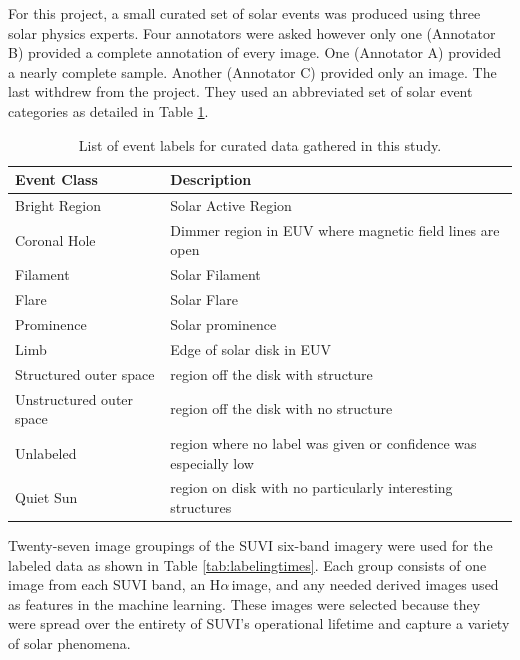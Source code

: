 \documentclass[twoside]{report}
\newcommand{\halpha}{H$\alpha$\,}
\begin{document}
For this project, a small curated set of solar events was produced using three solar physics experts.  Four annotators were asked however only one (Annotator B) provided a complete annotation of every image. One (Annotator A) provided a nearly complete sample. Another (Annotator C) provided only an image. The last withdrew from the project. They used an abbreviated set of solar event categories as detailed in Table \ref{tab:mylabels}. 


\begin{table}[ht!]
  \centering
  \begin{tabular}{|p{4cm} p{10cm}|}
    \hline
    Event Class & Description \\ \hline
    Bright Region & Solar Active Region\\
    Coronal Hole & Dimmer region in EUV where magnetic field lines are open\\
    Filament & Solar Filament \\
    Flare & Solar Flare \\
    Prominence & Solar prominence \\
    Limb & Edge of solar disk in EUV \\
    Structured outer space & region off the disk with structure \\
    Unstructured outer space & region off the disk with no structure \\
    Unlabeled & region where no label was given or confidence was especially low \\
    Quiet Sun & region on disk with no particularly interesting structures \\
    \hline             
  \end{tabular}
  \caption{List of event labels for curated data gathered in this study.}
  \label{tab:mylabels}
\end{table}

Twenty-seven image groupings of the SUVI six-band imagery were used for the labeled data as shown in Table \ref{tab:labelingtimes}. Each group consists of one image from each SUVI band, an \halpha image, and any needed derived images used as features in the machine learning. These images were selected because they were spread over the entirety of SUVI's operational lifetime and capture a variety of solar phenomena. 
\end{document}
